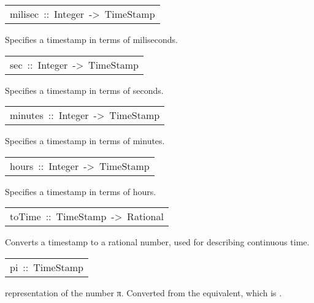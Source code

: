 \begin{haddockdesc}
\item[\begin{tabular}{@{}l}
milisec\ ::\ Integer\ ->\ TimeStamp
\end{tabular}]\haddockbegindoc
Specifies a timestamp in terms of miliseconds.\par


\item[\begin{tabular}{@{}l}
sec\ ::\ Integer\ ->\ TimeStamp
\end{tabular}]\haddockbegindoc
Specifies a timestamp in terms of seconds.\par


\item[\begin{tabular}{@{}l}
minutes\ ::\ Integer\ ->\ TimeStamp
\end{tabular}]\haddockbegindoc
Specifies a timestamp in terms of minutes.\par


\item[\begin{tabular}{@{}l}
hours\ ::\ Integer\ ->\ TimeStamp
\end{tabular}]\haddockbegindoc
Specifies a timestamp in terms of hours.\par


\item[\begin{tabular}{@{}l}
toTime\ ::\ TimeStamp\ ->\ Rational
\end{tabular}]\haddockbegindoc
Converts a timestamp to a rational number, used for describing
 continuous time.\par


\item[\begin{tabular}{@{}l}
pi\ ::\ TimeStamp
\end{tabular}]\haddockbegindoc
{} representation of the number π. Converted from
 the  equivalent, which is .\par

\end{haddockdesc}